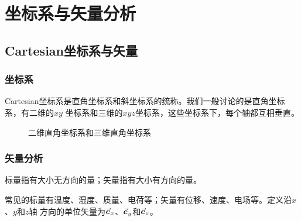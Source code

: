 \chapter{坐标系与矢量分析\label{chapter:reference}}

\section{Cartesian坐标系与矢量\label{section:reference-cartesian}}

\subsection{坐标系}
Cartesian坐标系是直角坐标系和斜坐标系的统称。我们一般讨论的是直角坐标系，有二维的$xy$
坐标系和三维的$xyz$坐标系，这些坐标系下，每个轴都互相垂直。
\begin{figure}[h]
    \centering
    \setlength{\abovecaptionskip}{0.2cm}
    \caption{二维直角坐标系和三维直角坐标系}
    \label{fig:CartesianCoord}
\end{figure}

\subsection{矢量分析}
\begin{definition}[标量和矢量]
    标量指有大小无方向的量；矢量指有大小有方向的量。 
\end{definition}
常见的标量有温度、湿度、质量、电荷等；矢量有位移、速度、电场等。定义沿$x$、$y$和$z$轴
方向的单位矢量为$\vec{\bm{e}}_x$、$\vec{\bm{e}}_y$和$\vec{\bm{e}}_z$。

